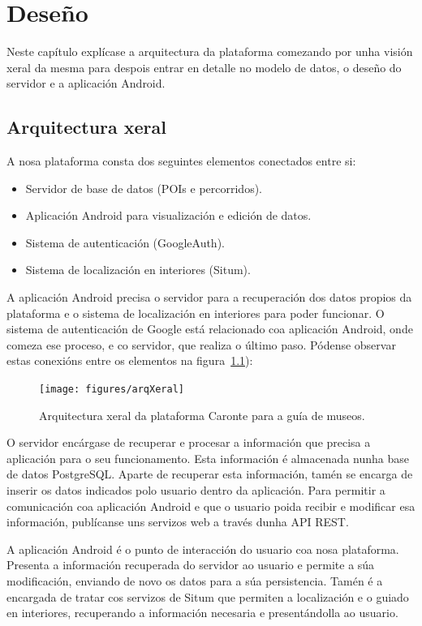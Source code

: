 \chapter{Deseño}
Neste capítulo explícase a arquitectura da plataforma comezando por unha visión xeral da mesma para despois entrar en detalle no modelo de datos, o deseño do servidor e a aplicación Android.


\section{Arquitectura xeral}

A nosa plataforma consta dos seguintes elementos conectados entre si:
\begin{itemize}
	\item Servidor de base de datos (POIs e percorridos).
	\item Aplicación Android para visualización e edición de datos.
	\item Sistema de autenticación (GoogleAuth).
	\item Sistema de localización en interiores (Situm).
\end{itemize}

A aplicación Android precisa o servidor para a recuperación dos datos propios da plataforma e o sistema de localización en interiores para poder funcionar. O sistema de autenticación de Google está relacionado coa aplicación Android, onde comeza ese proceso, e co servidor, que realiza o último paso. Pódense observar estas conexións entre os elementos na figura~\ref{fig:arq_xeral}):


\begin{figure}[tb] 
	\begin{center}
		\texttt{[image: figures/arqXeral]}
		\caption{Arquitectura xeral da plataforma Caronte para a guía de museos.}
		\label{fig:arq_xeral}
	\end{center}
\end{figure}

O servidor encárgase de recuperar e procesar a información que precisa a aplicación para o seu funcionamento. Esta información é almacenada nunha base de datos PostgreSQL. Aparte de recuperar esta información, tamén se encarga de inserir os datos indicados polo usuario dentro da aplicación. Para permitir a comunicación coa aplicación Android e que o usuario poida recibir e modificar esa información, publícanse uns servizos web a través dunha API REST.

A aplicación Android é o punto de interacción do usuario coa nosa plataforma. Presenta a información recuperada do servidor ao usuario e permite a súa modificación, enviando de novo os datos para a súa persistencia. Tamén é a encargada de tratar cos servizos de Situm que permiten a localización e o guiado en interiores, recuperando a información necesaria e presentándolla ao usuario.

